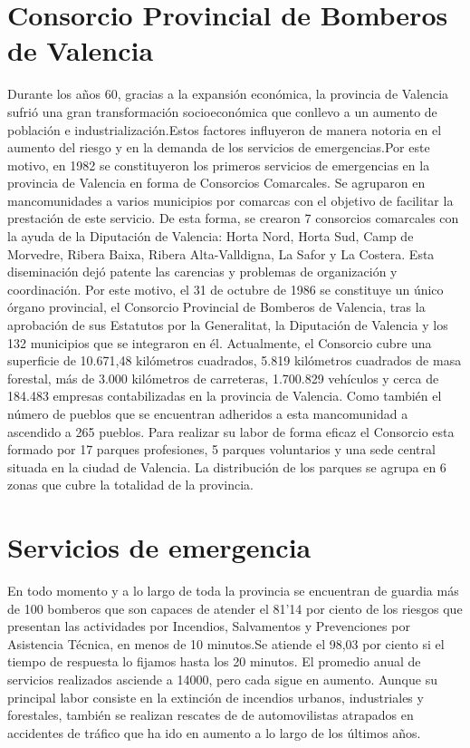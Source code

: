 \documentclass[12pt,a4paper,titlepage,twoside]{report}
\begin{document}
\section{Consorcio Provincial de Bomberos de Valencia}
Durante los años 60, gracias a la expansión económica, la provincia de Valencia sufrió una gran transformación socioeconómica que conllevo a un aumento de población e industrialización.Estos factores influyeron de manera notoria en el aumento del riesgo y en la demanda de los servicios de emergencias.Por este motivo, en 1982 se constituyeron los primeros servicios de emergencias en la provincia de Valencia en forma de Consorcios Comarcales. Se agruparon en mancomunidades a varios municipios por comarcas con el objetivo de facilitar la prestación de este servicio. De esta forma, se crearon 7 consorcios comarcales con la ayuda de la Diputación de Valencia: Horta Nord, Horta Sud, Camp de Morvedre, Ribera Baixa, Ribera Alta-Valldigna, La Safor y La Costera.
Esta diseminación dejó patente las carencias y problemas de organización y coordinación. Por este motivo, el 31 de octubre de 1986 se constituye un único órgano provincial, el Consorcio Provincial de Bomberos de Valencia, tras la aprobación de sus Estatutos por la Generalitat, la Diputación de Valencia y los 132 municipios que se integraron en él.
Actualmente, el Consorcio cubre una superficie de 10.671,48 kilómetros cuadrados, 5.819 kilómetros cuadrados de masa forestal, más de 3.000 kilómetros de carreteras, 1.700.829 vehículos y cerca de 184.483 empresas contabilizadas en la provincia de Valencia. Como también el número de pueblos que se encuentran adheridos a esta mancomunidad a ascendido a 265 pueblos. Para realizar su labor de forma eficaz el Consorcio esta formado por 17 parques profesiones, 5 parques voluntarios y una sede central situada en la ciudad de Valencia. La distribución de los parques se agrupa en 6 zonas que cubre la totalidad de la provincia. 
\section{Servicios de emergencia}
En todo momento y a lo largo de toda la provincia se encuentran de guardia más de 100 bomberos que son capaces de atender el 81'14 por ciento de los riesgos que presentan las actividades por Incendios, Salvamentos y Prevenciones por Asistencia Técnica, en menos de 10 minutos.Se atiende el 98,03 por ciento si el tiempo de respuesta lo fijamos hasta los 20 minutos.
El promedio anual de servicios realizados asciende a 14000, pero cada sigue en aumento. Aunque su principal labor consiste en la extinción de incendios urbanos, industriales y forestales, también se realizan rescates de de automovilistas atrapados en accidentes de tráfico que ha ido en aumento a lo largo de los últimos años. 
\end{document}
